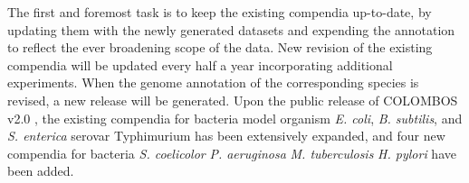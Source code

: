 
The first and foremost task is to keep the existing compendia up-to-date, by
updating them with the newly generated datasets and expending the annotation to 
reflect the ever broadening scope of the data.
%
New revision of the existing compendia will be updated every half a year
incorporating additional experiments.
%
When the genome annotation of the corresponding species is revised, a new
release will be generated.
%
Upon the public release of COLOMBOS v2.0 \cite{Meysman2014}, the existing
compendia for bacteria model organism \textit{E. coli}, \textit{B. subtilis},
and \textit{S. enterica} serovar Typhimurium has been extensively expanded, and
four new compendia for bacteria \textit{S. coelicolor} \textit{P. aeruginosa}
\textit{M. tuberculosis} \textit{H. pylori} have been added.



% 
%


